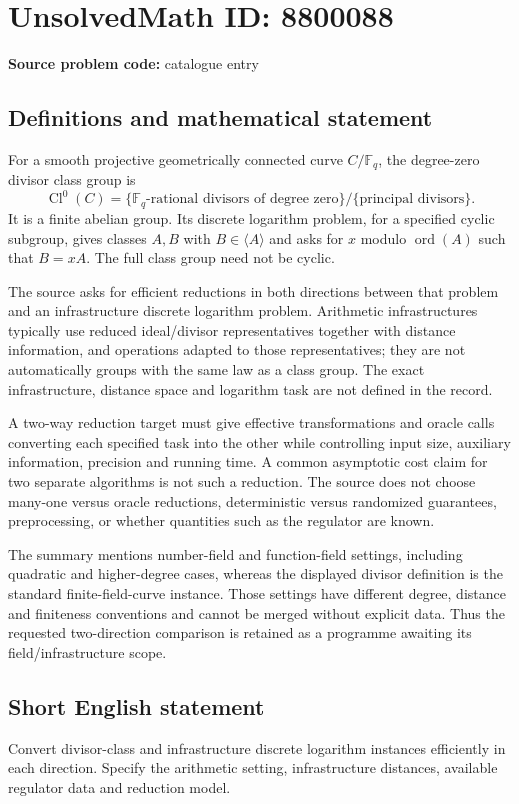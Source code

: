 \documentclass[11pt]{article}
\newcommand{\F}{\mathbb{F}}
\begin{document}
\section*{UnsolvedMath ID: 8800088}
\textbf{Source problem code:} catalogue entry
\subsection{Definitions and mathematical statement}
For a smooth projective geometrically connected curve $C/\F_q$, the degree-zero divisor class group is
\[
\operatorname{Cl}^0(C)=\{\text{$\F_q$-rational divisors of degree zero}\}/\{\text{principal divisors}\}.
\]
It is a finite abelian group. Its discrete logarithm problem, for a specified cyclic subgroup, gives classes $A,B$ with $B\in\langle A\rangle$ and asks for $x$ modulo $\operatorname{ord}(A)$ such that $B=xA$. The full class group need not be cyclic.

The source asks for efficient reductions in both directions between that problem and an infrastructure discrete logarithm problem. Arithmetic infrastructures typically use reduced ideal/divisor representatives together with distance information, and operations adapted to those representatives; they are not automatically groups with the same law as a class group. The exact infrastructure, distance space and logarithm task are not defined in the record.

A two-way reduction target must give effective transformations and oracle calls converting each specified task into the other while controlling input size, auxiliary information, precision and running time. A common asymptotic cost claim for two separate algorithms is not such a reduction. The source does not choose many-one versus oracle reductions, deterministic versus randomized guarantees, preprocessing, or whether quantities such as the regulator are known.

The summary mentions number-field and function-field settings, including quadratic and higher-degree cases, whereas the displayed divisor definition is the standard finite-field-curve instance. Those settings have different degree, distance and finiteness conventions and cannot be merged without explicit data. Thus the requested two-direction comparison is retained as a programme awaiting its field/infrastructure scope.
\subsection{Short English statement}
Convert divisor-class and infrastructure discrete logarithm instances efficiently in each direction. Specify the arithmetic setting, infrastructure distances, available regulator data and reduction model.
\end{document}
